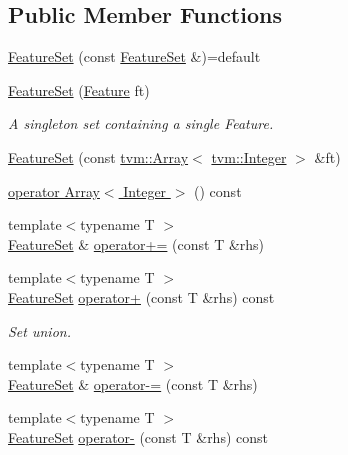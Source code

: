 \subsection*{Public Member Functions}
\begin{DoxyCompactItemize}
\item 
\hyperlink{classtvm_1_1relay_1_1FeatureSet_a268c7544d97aeb7ef3ac19778c23b577}{Feature\+Set} (const \hyperlink{classtvm_1_1relay_1_1FeatureSet}{Feature\+Set} \&)=default
\item 
\hyperlink{classtvm_1_1relay_1_1FeatureSet_a7fe9317883438c23defc65d12532387a}{Feature\+Set} (\hyperlink{namespacetvm_1_1relay_a926750aeda977340aa82bceac863fc9e}{Feature} ft)
\begin{DoxyCompactList}\small\item\em A singleton set containing a single Feature. \end{DoxyCompactList}\item 
\hyperlink{classtvm_1_1relay_1_1FeatureSet_a2b85e65f7b1de12a3ae87b8201427d51}{Feature\+Set} (const \hyperlink{classtvm_1_1Array}{tvm\+::\+Array}$<$ \hyperlink{classtvm_1_1Integer}{tvm\+::\+Integer} $>$ \&ft)
\item 
\hyperlink{classtvm_1_1relay_1_1FeatureSet_a103023c45ee24a93a895fd0b78fcce7a}{operator Array$<$ Integer $>$} () const 
\item 
{\footnotesize template$<$typename T $>$ }\\\hyperlink{classtvm_1_1relay_1_1FeatureSet}{Feature\+Set} \& \hyperlink{classtvm_1_1relay_1_1FeatureSet_a73e4e0de2e58ef67a88d27a48b3c3fc0}{operator+=} (const T \&rhs)
\item 
{\footnotesize template$<$typename T $>$ }\\\hyperlink{classtvm_1_1relay_1_1FeatureSet}{Feature\+Set} \hyperlink{classtvm_1_1relay_1_1FeatureSet_a2de909bb66c16b2ed7ae76cc4bb843eb}{operator+} (const T \&rhs) const 
\begin{DoxyCompactList}\small\item\em Set union. \end{DoxyCompactList}\item 
{\footnotesize template$<$typename T $>$ }\\\hyperlink{classtvm_1_1relay_1_1FeatureSet}{Feature\+Set} \& \hyperlink{classtvm_1_1relay_1_1FeatureSet_ad90ce4d929774c0feb92c3eb56bea338}{operator-\/=} (const T \&rhs)
\item 
{\footnotesize template$<$typename T $>$ }\\\hyperlink{classtvm_1_1relay_1_1FeatureSet}{Feature\+Set} \hyperlink{classtvm_1_1relay_1_1FeatureSet_a122b67229c2281d4138fcb41ccab13f0}{operator-\/} (const T \&rhs) const 

\end{DoxyCompactItemize}
